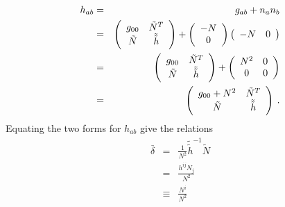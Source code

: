 \begin{eqnarray*}
   h_{ab} & = &  g_{ab} + n_{a}n_{b}  \\
             & = & \left(
                      \begin{array}{cc}
                         g_{00}   & {\tilde N}^T \\
                         \tilde N & {\tilde {\tilde h}}
                      \end{array}
                   \right) +
                   \left(
                      \begin{array}{c}
                         -N \\
                          0
                      \end{array}
                   \right)
                   \left(
                      \begin{array}{c c}
                         -N & 0
                      \end{array}
                   \right)\\
             & = & \left(
                      \begin{array}{cc}
                         g_{00}   & {\tilde N}^T \\
                         \tilde N & {\tilde {\tilde h}}
                      \end{array}
                   \right) +
                   \left(
                      \begin{array}{cc}
                         N^2 & 0 \\
                         0   & 0
                      \end{array}
                   \right) \\
             & = & \left(
                      \begin{array}{cc}
                         g_{00} + N^2  & {\tilde N}^T \\
                         \tilde N & {\tilde {\tilde h}}
                      \end{array}
                   \right) \: .
\end{eqnarray*}
Equating the two forms for $h_{a b}$ give the relations
\begin{eqnarray*}
   \bar \delta & = & \frac{1}{N^2} {\tilde {\tilde h}}^{-1} {\tilde N} \\
               & = & \frac{h^{ij} N_j}{N^2} \\
               & \equiv & \frac{N^i}{N^2}
\end{eqnarray*}
